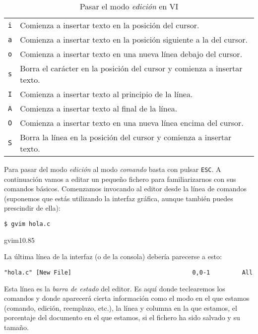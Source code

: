 \begin{table}[htbp]
\centering
{}
\begin{tabular}{|c|p{}|}
\hline
{\tt i} & Comienza a insertar texto en la posición del cursor. \\
{\tt a} & Comienza a insertar texto en la posición siguiente a la del cursor. \\
{\tt o} & Comienza a insertar texto en una nueva línea debajo del cursor. \\
{\tt s} & Borra el carácter en la  posición del cursor y comienza a insertar texto. \\ 
\hline
{\tt I} & Comienza a insertar texto al principio de la línea. \\
{\tt A} & Comienza a insertar texto al final de la línea. \\
{\tt O} & Comienza a insertar texto en una nueva línea encima del cursor. \\
{\tt S} & Borra la línea en la  posición del cursor y comienza a insertar texto. \\

\hline
\end{tabular}
\caption{Pasar el modo {\em edición} en {\sf VI}}
\end{table}

Para pasar  del modo  {\em edición}  al modo  {\em comando}  basta con
pulsar {\tt  ESC}. A  continuación vamos a  editar un  pequeño fichero
para familiarizarnos con sus comandos básicos. Comenzamos invocando al
editor desde la  línea de comandos (suponemos que  estás utilizando la
interfaz gráfica, aunque también puedes prescindir de ella):

\begin{verbatim}
$ gvim hola.c
\end{verbatim}

\begin{figura}{gvim1}{0.85}
\caption{Interfaz gráfica de VIM con un fichero nuevo (vacío)}
\end{figura}

La última línea  de la interfaz (o de la  consola) debería parecerse a
esto:

\begin{verbatim}
"hola.c" [New File]                                  0,0-1         All
\end{verbatim}

Esta  línea es  la {\em  barra de  estado} del  editor. Es  aquí donde
teclearemos los comandos y donde  aparecerá cierta información como el
modo en el que estamos (comando, edición, reemplazo, etc.), la línea y
columna  en la  que estamos,  el porcentaje  del documento  en el  que
estamos, si el fichero ha sido salvado y su tamaño.

